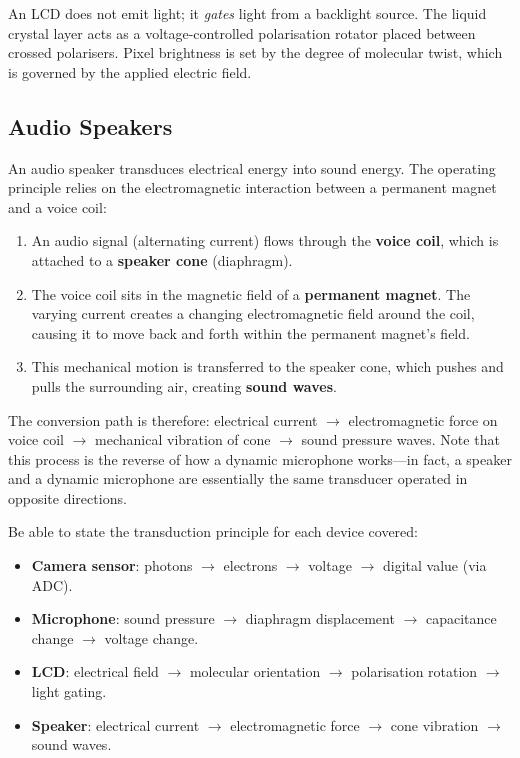 \documentclass[11pt, a4paper, notitlepage]{report}
\theoremstyle{definition}
\theoremstyle{remark}
\theoremstyle{definition}
\begin{document}
\begin{keyresult}[title={Key Result: LCD Light-Gating Principle}]
  An LCD does not emit light; it \emph{gates} light from a backlight source. The liquid crystal layer acts as a voltage-controlled polarisation rotator placed between crossed polarisers. Pixel brightness is set by the degree of molecular twist, which is governed by the applied electric field.
\end{keyresult}

\subsection{Audio Speakers}
\label{sec:speaker}

An audio speaker transduces electrical energy into sound energy. The operating principle relies on the electromagnetic interaction between a permanent magnet and a voice coil:

\begin{enumerate}
  \item An audio signal (alternating current) flows through the \textbf{voice coil}, which is attached to a \textbf{speaker cone} (diaphragm).
  \item The voice coil sits in the magnetic field of a \textbf{permanent magnet}. The varying current creates a changing electromagnetic field around the coil, causing it to move back and forth within the permanent magnet's field.
  \item This mechanical motion is transferred to the speaker cone, which pushes and pulls the surrounding air, creating \textbf{sound waves}.
\end{enumerate}

The conversion path is therefore: electrical current $\rightarrow$ electromagnetic force on voice coil $\rightarrow$ mechanical vibration of cone $\rightarrow$ sound pressure waves. Note that this process is the reverse of how a dynamic microphone works---in fact, a speaker and a dynamic microphone are essentially the same transducer operated in opposite directions.

\begin{examtip}[title={Exam Tip: Transduction Summary for I/O Devices}]
  Be able to state the transduction principle for each device covered:
  \begin{itemize}
    \item \textbf{Camera sensor}: photons $\rightarrow$ electrons $\rightarrow$ voltage $\rightarrow$ digital value (via ADC).
    \item \textbf{Microphone}: sound pressure $\rightarrow$ diaphragm displacement $\rightarrow$ capacitance change $\rightarrow$ voltage change.
    \item \textbf{LCD}: electrical field $\rightarrow$ molecular orientation $\rightarrow$ polarisation rotation $\rightarrow$ light gating.
    \item \textbf{Speaker}: electrical current $\rightarrow$ electromagnetic force $\rightarrow$ cone vibration $\rightarrow$ sound waves.
  \end{itemize}
\end{examtip}
\end{document}
